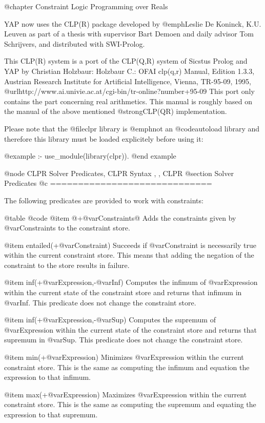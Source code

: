 @chapter Constraint Logic Programming over Reals

YAP now uses the CLP(R) package developed by @emph{Leslie De Koninck},
K.U. Leuven as part of a thesis with supervisor Bart Demoen and daily
advisor Tom Schrijvers, and distributed with SWI-Prolog.

This CLP(R) system is a port of the CLP(Q,R) system of Sicstus Prolog
and YAP by Christian Holzbaur: Holzbaur C.: OFAI clp(q,r) Manual,
Edition 1.3.3, Austrian Research Institute for Artificial
Intelligence, Vienna, TR-95-09, 1995,
@url{http://www.ai.univie.ac.at/cgi-bin/tr-online?number+95-09} This
port only contains the part concerning real arithmetics. This manual
is roughly based on the manual of the above mentioned @strong{CLP(QR)}
implementation.

Please note that the @file{clpr} library is @emph{not} an
@code{autoload} library and therefore this library must be loaded
explicitely before using it:

@example
:- use_module(library(clpr)).
@end example

@node CLPR Solver Predicates, CLPR Syntax , , CLPR
@section Solver Predicates
@c =============================

The following predicates are provided to work with constraints:

@table @code
	@item @{+@var{Constraints}@}
Adds the constraints given by @var{Constraints} to the constraint store.

	@item entailed(+@var{Constraint})
Succeeds if @var{Constraint} is necessarily true within the current
constraint store. This means that adding the negation of the constraint
to the store results in failure.

	@item inf(+@var{Expression},-@var{Inf})
Computes the infimum of @var{Expression} within the current state of the
constraint store and returns that infimum in @var{Inf}. This predicate
does not change the constraint store.

	@item inf(+@var{Expression},-@var{Sup})
Computes the supremum of @var{Expression} within the current state of
the constraint store and returns that supremum in @var{Sup}. This
predicate does not change the constraint store.

	@item min(+@var{Expression})
Minimizes @var{Expression} within the current constraint store. This is
the same as computing the infimum and equation the expression to that
infimum.

	@item max(+@var{Expression})
Maximizes @var{Expression} within the current constraint store. This is
the same as computing the supremum and equating the expression to that
supremum.

